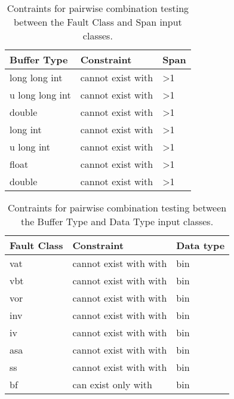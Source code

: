 

\begin{table}[ht]

  \scriptsize
  \centering
  \caption{Contraints for pairwise combination testing between the Fault Class and Span input classes.}
  \label{table:constraints_1_DAMA}

  \begin{tabular}{@{}lll@{}}
  \toprule
  \textbf{Buffer   Type} & \textbf{Constraint} & \textbf{Span}   \\ \midrule
  long long int          & cannot exist with       & \textgreater{}1 \\
  u long long int        & cannot exist with       & \textgreater{}1 \\
  double                 & cannot exist with       & \textgreater{}1 \\
  long int               & cannot exist with       & \textgreater{}1 \\
  u long int             & cannot exist with       & \textgreater{}1 \\
  float                  & cannot exist with       & \textgreater{}1 \\
  double                 & cannot exist with       & \textgreater{}1 \\ \bottomrule
  \end{tabular}

\end{table}


\begin{table}[ht]

\scriptsize
\centering
\caption{Contraints for pairwise combination testing between the Buffer Type and Data Type input classes.}
\label{table:constraints_2_DAMA}

\begin{tabular}{@{}lll@{}}
\toprule
\textbf{Fault Class} & \textbf{Constraint} & \textbf{Data type} \\ \midrule
vat                  & cannot exist with with  & bin                \\
vbt                  & cannot exist with with  & bin                \\
vor                  & cannot exist with with  & bin                \\
inv                  & cannot exist with with  & bin                \\
iv                   & cannot exist with with  & bin                \\
asa                  & cannot exist with with  & bin                \\
ss                   & cannot exist with with  & bin                \\
bf                   & can exist only with & bin                \\ \bottomrule
\end{tabular}

\end{table}


